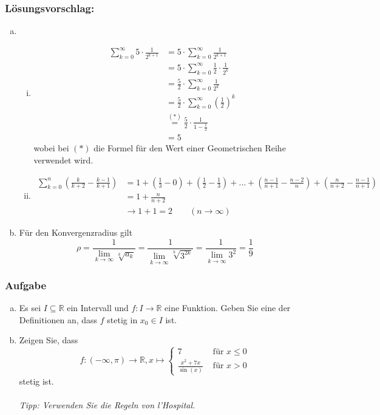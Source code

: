\documentclass[a4paper,11pt]{scrartcl}
\newcounter{auf}
\newcommand{\Aufgabe}%
        {\addtocounter{auf}{1} \subsubsection*{\rmfamily  Aufgabe \theauf \hspace{1em}} }
\newcommand{\RR}{\mathbb{R}}
\begin{document}
\subsubsection*{Lösungsvorschlag:}
\begin{enumerate}[a)]
\item 
	\begin{enumerate}[i)]
	\item \begin{align*}
	\sum \limits_{k=0}^\infty 5\cdot \frac{1}{2^{k+1}}&=5 \cdot \sum \limits_{k=0}^\infty \frac{1}{2^{k+1}}\\
	 &=5 \cdot \sum \limits_{k=0}^\infty \frac{1}{2}\cdot\frac{1}{2^{k}} \\
	 &=\frac{5}{2} \cdot \sum \limits_{k=0}^\infty \frac{1}{2^{k}} \\
	 &=\frac{5}{2} \cdot \sum \limits_{k=0}^\infty \left(\frac{1}{2}\right)^{k} \\
	 &\stackrel{(*)}{=}\frac{5}{2} \cdot \frac{1}{1-\frac{1}{2}}\\
	 &=5
	 \end{align*}
	 wobei bei $(*)$ die Formel für den Wert einer Geometrischen Reihe verwendet wird.
	\item \begin{align*}
	\sum \limits_{k=0}^n\left( \frac{k}{k+2}-\frac{k-1}{k+1}\right)&=1+\left( \frac{1}{3}-0\right)+\left(\frac{1}{2}-\frac{1}{3}\right)+...+\left(\frac{n-1}{n+1}-\frac{n-2}{n} \right)+\left(\frac{n}{n+2}-\frac{n-1}{n+1} \right)\\
	&= 1+\frac{n}{n+2}\\
	&\to 1+1=2 \qquad (n \to \infty)
	\end{align*}
	\end{enumerate}
\item Für den Konvergenzradius gilt
$$
\rho=\frac{1}{\lim \limits_{k \to \infty} \sqrt[k]{a_k}}=\frac{1}{\lim \limits_{k \to \infty} \sqrt[k]{3^{2k}}}=\frac{1}{\lim \limits_{k \to \infty} 3^2 }=\frac{1}{9}
$$
\end{enumerate}


\newpage
\Aufgabe 
\begin{enumerate}[a)]
\item Es sei $I \subseteq \RR$ ein Intervall und $f:I \to \RR$ eine Funktion. Geben Sie eine der Definitionen an, dass $f$ stetig in $x_0 \in I$ ist.
\item Zeigen Sie, dass
$$
f: (-\infty, \pi) \to \RR, x \mapsto \begin{cases} 7 & \text{ für } x\le 0 \\ \frac{x^2+7x}{\sin(x)} & \text{ für } x>0 \end{cases}
$$
stetig ist.\\\quad\\
\textit{Tipp: Verwenden Sie die Regeln von l'Hospital.}
\end{enumerate}
\end{document}
